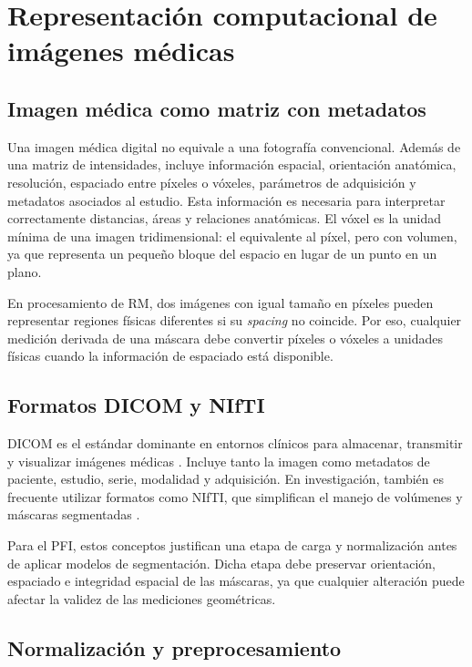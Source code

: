 \section{Representación computacional de imágenes médicas}

\subsection{Imagen médica como matriz con metadatos}

Una imagen médica digital no equivale a una fotografía convencional. Además de una matriz de intensidades, incluye información espacial, orientación anatómica, resolución, espaciado entre píxeles o vóxeles, parámetros de adquisición y metadatos asociados al estudio. Esta información es necesaria para interpretar correctamente distancias, áreas y relaciones anatómicas. El vóxel es la unidad mínima de una imagen tridimensional: el equivalente al píxel, pero con volumen, ya que representa un pequeño bloque del espacio en lugar de un punto en un plano.

En procesamiento de RM, dos imágenes con igual tamaño en píxeles pueden representar regiones físicas diferentes si su \textit{spacing} no coincide. Por eso, cualquier medición derivada de una máscara debe convertir píxeles o vóxeles a unidades físicas cuando la información de espaciado está disponible.

\subsection{Formatos DICOM y NIfTI}

DICOM es el estándar dominante en entornos clínicos para almacenar, transmitir y visualizar imágenes médicas \parencite{nema_dicom_2024}. Incluye tanto la imagen como metadatos de paciente, estudio, serie, modalidad y adquisición. En investigación, también es frecuente utilizar formatos como NIfTI, que simplifican el manejo de volúmenes y máscaras segmentadas \parencite{cox_nifti_2004}.

Para el PFI, estos conceptos justifican una etapa de carga y normalización antes de aplicar modelos de segmentación. Dicha etapa debe preservar orientación, espaciado e integridad espacial de las máscaras, ya que cualquier alteración puede afectar la validez de las mediciones geométricas.

\subsection{Normalización y preprocesamiento}

